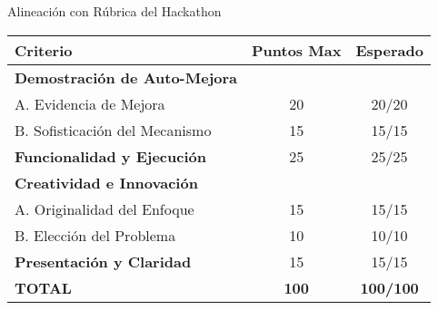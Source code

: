 \documentclass[aspectratio=169,11pt]{beamer}
\begin{document}
\begin{frame}{Alineación con Rúbrica del Hackathon}
\begin{table}[h]
\centering
\small
\begin{tabular}{|l|c|c|}
\hline
\textbf{Criterio} & \textbf{Puntos Max} & \textbf{Esperado} \\ \hline
\textbf{Demostración de Auto-Mejora} & & \\ \hline
\quad A. Evidencia de Mejora & 20 & \textcolor{kavakgreen}{20/20} \\ \hline
\quad B. Sofisticación del Mecanismo & 15 & \textcolor{kavakgreen}{15/15} \\ \hline
\textbf{Funcionalidad y Ejecución} & 25 & \textcolor{kavakgreen}{25/25} \\ \hline
\textbf{Creatividad e Innovación} & & \\ \hline
\quad A. Originalidad del Enfoque & 15 & \textcolor{kavakgreen}{15/15} \\ \hline
\quad B. Elección del Problema & 10 & \textcolor{kavakgreen}{10/10} \\ \hline
\textbf{Presentación y Claridad} & 15 & \textcolor{kavakgreen}{15/15} \\ \hline
\hline
\textbf{TOTAL} & \textbf{100} & \textcolor{kavakgreen}{\textbf{100/100}} \\ \hline
\end{tabular}
\end{table}
\end{frame}
\end{document}
